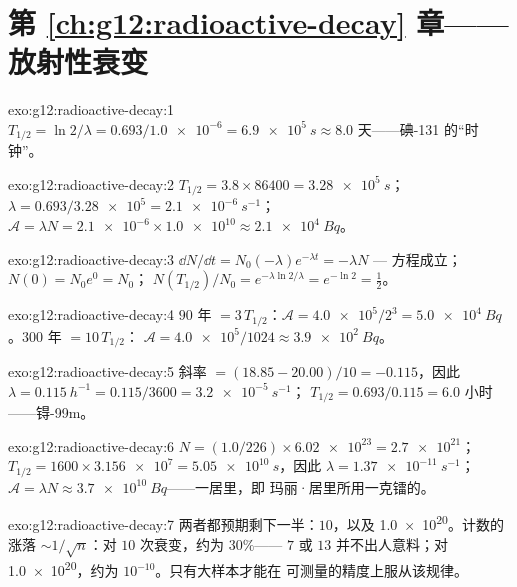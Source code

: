 \section*{第 \ref{ch:g12:radioactive-decay} 章——放射性衰变}

\begin{solution}{exo:g12:radioactive-decay:1}
$T_{1/2} = \ln 2/\lambda = 0.693/\num{1.0e-6} = \qty{6.9e5}{s}
\approx 8.0$ 天——碘-131 的“时钟”。
\end{solution}

\begin{solution}{exo:g12:radioactive-decay:2}
$T_{1/2} = 3.8 \times \num{86400} = \qty{3.28e5}{s}$；
$\lambda = 0.693/\num{3.28e5} = \qty{2.1e-6}{s^{-1}}$；
$\mathcal A = \lambda N = \num{2.1e-6} \times \num{1.0e10} \approx
\qty{2.1e4}{Bq}$。
\end{solution}

\begin{solution}{exo:g12:radioactive-decay:3}
$\dd N/\dd t = N_0(-\lambda)e^{-\lambda t} = -\lambda N$ ---
方程成立；$N(0) = N_0 e^0 = N_0$；
$N(T_{1/2})/N_0 = e^{-\lambda \ln 2/\lambda} = e^{-\ln 2} =
\tfrac12$。
\end{solution}

\begin{solution}{exo:g12:radioactive-decay:4}
$90$ 年 $= 3\,T_{1/2}$：$\mathcal A = \num{4.0e5}/2^3 =
\qty{5.0e4}{Bq}$。$300$ 年 $= 10\,T_{1/2}$：
$\mathcal A = \num{4.0e5}/1024 \approx \qty{3.9e2}{Bq}$。
\end{solution}

\begin{solution}{exo:g12:radioactive-decay:5}
斜率 $= (18.85 - 20.00)/10 = -0.115$，因此
$\lambda = \qty{0.115}{h^{-1}} = 0.115/3600 = \qty{3.2e-5}{s^{-1}}$；
$T_{1/2} = 0.693/0.115 = 6.0$ 小时——锝-99m。
\end{solution}

\begin{solution}{exo:g12:radioactive-decay:6}
$N = (1.0/226) \times \num{6.02e23} = \num{2.7e21}$；
$T_{1/2} = 1600 \times \num{3.156e7} = \qty{5.05e10}{s}$，因此
$\lambda = \qty{1.37e-11}{s^{-1}}$；
$\mathcal A = \lambda N \approx \qty{3.7e10}{Bq}$——一居里，即
玛丽·居里所用一克镭的。
\end{solution}

\begin{solution}{exo:g12:radioactive-decay:7}
两者都预期剩下一半：$10$，以及 \num{1.0e20}。计数的涨落
$\sim 1/\sqrt{n}$：对 $10$ 次衰变，约为 $30\%$——
$7$ 或 $13$ 并不出人意料；对 \num{1.0e20}，约为
$10^{-10}$。只有大样本才能在
可测量的精度上服从该规律。
\end{solution}

